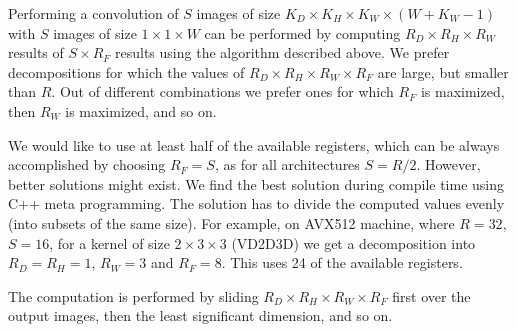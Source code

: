   Performing a convolution of $S$ images of size $K_D \times K_H
  \times K_W \times (W+K_W-1)$ with $S$ images of size $1 \times 1
  \times W$ can be performed by computing $R_D \times R_H \times R_W$
  results of $S \times R_F$ results using the algorithm described
  above.  We prefer decompositions for which the values of $R_D \times
  R_H \times R_W \times R_F$ are large, but smaller than $R$.  Out of
  different combinations we prefer ones for which $R_F$ is maximized,
  then $R_W$ is maximized, and so on.

  We would like to use at least half of the available registers, which
  can be always accomplished by choosing $R_F = S$, as for all
  architectures $S = R/2$.  However, better solutions might exist.  We
  find the best solution during compile time using C++ meta
  programming.  The solution has to divide the computed values evenly
  (into subsets of the same size).  For example, on AVX512 machine,
  where $R=32$, $S=16$, for a kernel of size $2 \times 3 \times 3$
  (VD2D3D) we get a decomposition into $R_D=R_H=1$, $R_W=3$ and
  $R_F=8$.  This uses 24 of the available registers.

  The computation is performed by sliding $R_D \times R_H \times R_W
  \times R_F$ first over the output images, then the least significant
  dimension, and so on.


